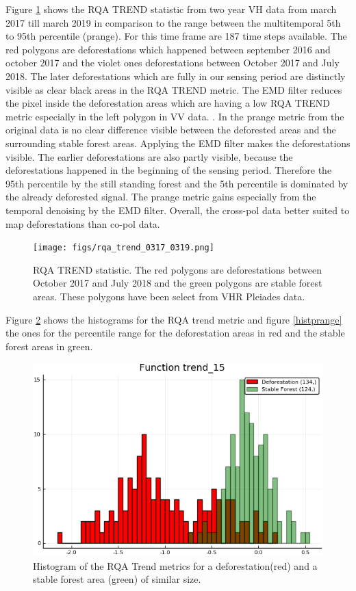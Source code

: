 \documentclass{article}
\begin{document}
Figure \ref{trend} shows the RQA TREND statistic from two year VH data from march 2017 till march 2019 in comparison to the range between the multitemporal 5th to 95th percentile (prange).
For this time frame are 187 time steps available.
The red polygons are deforestations which happened between september 2016 and october 2017 and the violet ones deforestations between October 2017 and July 2018.
The later deforestations which are fully in our sensing period are distinctly visible as clear black areas in the RQA TREND metric.
The EMD filter reduces the pixel inside the deforestation areas which are having a low RQA TREND metric especially in the left polygon in VV data. .
In the prange metric from the original data is no clear difference visible between the deforested areas and the surrounding stable forest areas.
Applying the EMD filter makes the deforestations visible.
The earlier deforestations are also partly visible, because the deforestations happened in the beginning of the sensing period.
Therefore the 95th percentile by the still standing forest and the 5th percentile is dominated by the already deforested signal.
The prange metric gains especially from the temporal denoising by the EMD filter.
Overall, the cross-pol data better suited to map deforestations than co-pol data.


\begin{figure}
  \texttt{[image: figs/rqa\_trend\_0317\_0319.png]}
  \caption{RQA TREND statistic.  The red polygons are deforestations between October 2017 and July 2018 and the green polygons are stable forest areas.
  These polygons have been select from VHR Pleiades data.}
  \label{trend}
\end{figure}


Figure \ref{histtrend} shows the histograms for the RQA trend metric and figure \ref{histprange} the ones for the percentile range for the deforestation areas in red and the stable forest areas in green.

\begin{figure}
  \includegraphics[width=\textwidth]{figs/histogram_trend1_5_0317_0319_polygon_5.png}
  \caption{Histogram of the RQA Trend metrics for a deforestation(red) and a stable forest area (green) of similar size.}
  \label{histtrend}
\end{figure}
\end{document}
